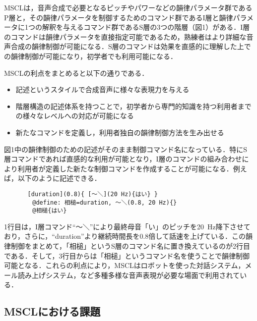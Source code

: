 \documentclass[japanese]{jnlp_1.4}
\begin{document}
MSCLは，音声合成で必要となるピッチやパワーなどの韻律パラメータ群であるP層と，その韻律パラメータを制御するためのコマンド群であるI層と韻律パラメータに1つの解釈を与えるコマンド群であるS層の3つの階層（図1）がある．I層のコマンドは韻律パラメータを直接指定可能であるため，熟練者はより詳細な音声合成の韻律制御が可能になる．S層のコマンドは効果を直感的に理解した上での韻律制御が可能になり，初学者でも利用可能になる．


MSCLの利点をまとめると以下の通りである．
\begin{itemize}
\item 記述というスタイルで合成音声に様々な表現力を与える
\item 階層構造の記述体系を持つことで，初学者から専門的知識を持つ利用者までの様々なレベルへの対応が可能になる
\item 新たなコマンドを定義し，利用者独自の韻律制御方法を生み出せる
\end{itemize}
図1中の韻律制御のための記述がそのまま制御コマンド名になっている．特にS層コマンドであれば直感的な利用が可能となり，I層のコマンドの組み合わせにより利用者が定義した新たな制御コマンドを作成することが可能になる．例えば，以下のように記述できる．
\begin{verbatim}
　　　　[duration](0.8){ [〜＼](20 Hz){はい} }
        @define: 相槌=duration, 〜＼(0.8, 20 Hz){}
        @相槌{はい}
\end{verbatim}
1行目は，I層コマンド“〜＼”により最終母音「い」のピッチを20~Hz降下させており，さらに，``duration''より継続時間長を0.8倍して話速を上げている．この韻律制御をまとめて，「相槌」というS層のコマンド名に置き換えているのが2行目である．そして，3行目からは「相槌」というコマンド名を使うことで韻律制御可能となる．これらの利点により，MSCLはロボットを使った対話システム\cite{Yamato}，メール読み上げシステム\cite{Nakayama}，など多種多様な音声表現が必要な場面で利用されている．


\subsection{MSCLにおける課題}
\end{document}
